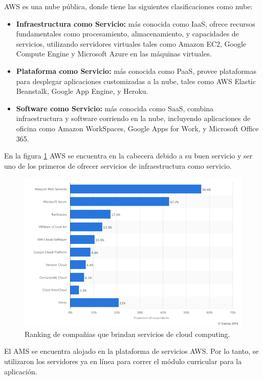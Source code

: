 AWS es una nube pública, donde tiene las siguientes clasificaciones como nube:
\begin{itemize}
	\item \textbf{Infraestructura como Servicio:} más conocida como IaaS, ofrece recursos fundamentales como procesamiento, almacenamiento, y capacidades de servicios, utilizando servidores virtuales tales como Amazon EC2, Google Compute Engine y Microsoft Azure en las máquinas virtuales.
	\item \textbf{Plataforma como Servicio:} más conocida como PaaS, provee plataformas para desplegar aplicaciones customizadas a la nube, tales como AWS Elastic Beanstalk, Google App Engine, y Heroku.
	\item \textbf{Software como Servicio:} más conocida como SaaS, combina infraestructura y software corriendo en la nube, incluyendo aplicaciones de oficina como Amazon WorkSpaces, Google Apps for Work, y Microsoft Office 365.
\end{itemize}

En la figura \ref{graph_cloud} AWS se encuentra en la cabecera debido a su buen servicio y ser uno de los primeros de ofrecer servicios de infraestructura como servicio.

\begin{figure}[H]
\centering
\includegraphics[width=125mm,scale=1]{Figuras/tecnologias/rank_cloud}
\caption{Ranking de compañias que brindan servicios de cloud computing.}
  \label{graph_cloud}
\end{figure}

El AMS se encuentra alojado en la plataforma de servicios AWS. Por lo tanto, se utilizaron los servidores ya en línea para correr el módulo curricular para la aplicación.

